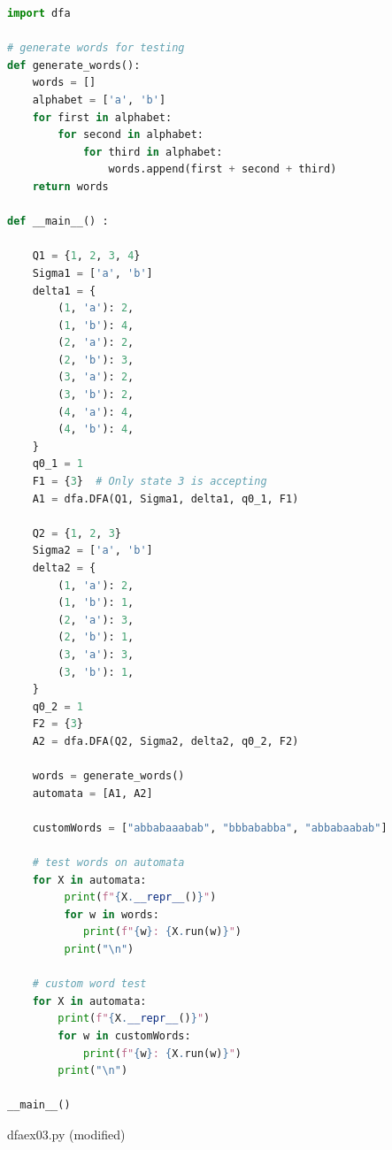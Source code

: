 \documentclass{article}
\begin{document}
\begin{lstlisting}[language=Python]
import dfa

# generate words for testing
def generate_words():
    words = []
    alphabet = ['a', 'b']
    for first in alphabet:
        for second in alphabet:
            for third in alphabet:
                words.append(first + second + third)
    return words

def __main__() :
    
    Q1 = {1, 2, 3, 4}
    Sigma1 = ['a', 'b']
    delta1 = {
        (1, 'a'): 2,
        (1, 'b'): 4,
        (2, 'a'): 2,
        (2, 'b'): 3,
        (3, 'a'): 2,
        (3, 'b'): 2,
        (4, 'a'): 4,
        (4, 'b'): 4,
    }
    q0_1 = 1
    F1 = {3}  # Only state 3 is accepting
    A1 = dfa.DFA(Q1, Sigma1, delta1, q0_1, F1)

    Q2 = {1, 2, 3}
    Sigma2 = ['a', 'b']
    delta2 = {
        (1, 'a'): 2,
        (1, 'b'): 1,
        (2, 'a'): 3,
        (2, 'b'): 1,
        (3, 'a'): 3,
        (3, 'b'): 1,
    }
    q0_2 = 1
    F2 = {3}  
    A2 = dfa.DFA(Q2, Sigma2, delta2, q0_2, F2)
    
    words = generate_words()
    automata = [A1, A2]

    customWords = ["abbabaaabab", "bbbababba", "abbabaabab"]
    
    # test words on automata
    for X in automata:
         print(f"{X.__repr__()}")
         for w in words:
            print(f"{w}: {X.run(w)}")
         print("\n")

    # custom word test
    for X in automata:
        print(f"{X.__repr__()}")
        for w in customWords:
            print(f"{w}: {X.run(w)}")
        print("\n")

__main__()
\end{lstlisting}

dfaex03.py (modified)
\end{document}
